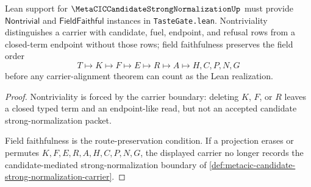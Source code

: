 \begin{theorem}
\label{thm:metacic-candidate-strong-normalization-tastegate-boundary}
Lean support for $\MetaCICCandidateStrongNormalizationUp$ must provide $\mathsf{Nontrivial}$ and $\mathsf{FieldFaithful}$ instances in \texttt{TasteGate.lean}. Nontriviality distinguishes a carrier with candidate, fuel, endpoint, and refusal rows from a closed-term endpoint without those rows; field faithfulness preserves the field order
$$
T \longmapsto K \longmapsto F \longmapsto E \longmapsto R \longmapsto A \longmapsto H,C,P,N,G
$$
before any carrier-alignment theorem can count as the Lean realization.
\end{theorem}
\begin{proof}
Nontriviality is forced by the carrier boundary: deleting $K$, $F$, or $R$ leaves a closed typed term and an endpoint-like read, but not an accepted candidate strong-normalization packet.

Field faithfulness is the route-preservation condition. If a projection erases or permutes $K,F,E,R,A,H,C,P,N,G$, the displayed carrier no longer records the candidate-mediated strong-normalization boundary of \autoref{def:metacic-candidate-strong-normalization-carrier}.
\end{proof}




